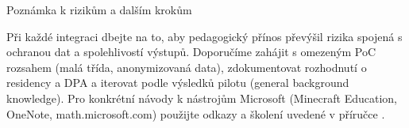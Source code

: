 Poznámka k rizikům a dalším krokům

Při každé integraci dbejte na to, aby pedagogický přínos převýšil rizika spojená s ochranou dat a spolehlivostí výstupů. Doporučíme zahájit s omezeným PoC rozsahem (malá třída, anonymizovaná data), zdokumentovat rozhodnutí o residency a DPA a iterovat podle výsledků pilotu (general background knowledge). Pro konkrétní návody k nástrojům Microsoft (Minecraft Education, OneNote, math.microsoft.com) použijte odkazy a školení uvedené v příručce \cite{kb_ai_101_tipu_pdf_04e4a115_page_15_2,kb_ai_101_tipu_pdf_04e4a115_page_8_1,kb_ai_101_tipu_pdf_04e4a115_page_54_1}.